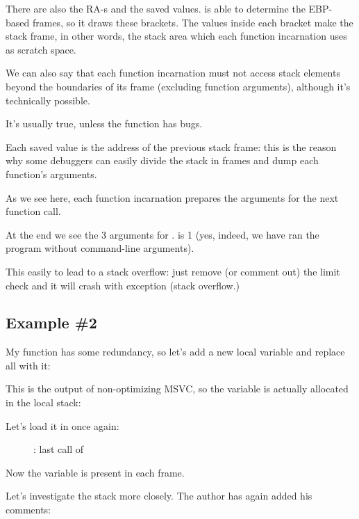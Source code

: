 There are also the \ac{RA}-s and the saved \EBP values.
\olly is able to determine the EBP-based frames, so it draws these brackets.
The values inside each bracket make the \gls{stack frame}, 
in other words, the stack area which each function incarnation uses as scratch space. 

We can also say that each function incarnation must not access
stack elements beyond the boundaries of its frame (excluding function arguments), 
although it's technically possible. 

It's usually true, unless the function has bugs.

Each saved \EBP value is the address of the previous \gls{stack frame}: 
this is the reason why some debuggers can easily divide the stack in frames and dump each 
function's arguments.

As we see here, each function incarnation prepares the arguments for the next function call.

At the end we see the 3 arguments for \main. 
 is 1 (yes, indeed, we have ran the program without command-line arguments).

This easily to lead to a stack overflow: just remove (or comment out) the limit check and it will crash with
exception  (stack overflow.)

\subsection{Example \#2}

My function has some redundancy, so let's add a new local variable  and replace all  with it:



This is the output of non-optimizing MSVC, so the  variable is actually allocated 
in the local stack:



\clearpage
Let's load it in \olly once again:

\begin{figure}[H]
\centering
{}
\caption{\olly: last call of \ttf{}}
\label{fig:fib_olly2}
\end{figure}

Now the  variable is present in each frame.

\clearpage

Let's investigate the stack more closely. The author has again added his comments:

